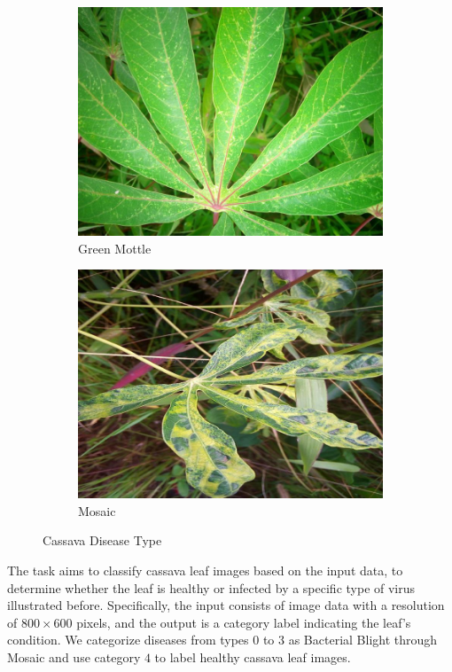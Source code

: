 \begin{figure}[htbp]
\begin{subfigure}{0.24\textwidth}
        \centering
        \includegraphics[width=\linewidth]{graphs/DiseaseImage/GreenMottle.jpg}
        \caption{Green Mottle}
        \label{CassavaFigGreen}
    \end{subfigure}
        \begin{subfigure}{0.24\textwidth}
        \centering
        \includegraphics[width=\linewidth]{graphs/DiseaseImage/Mosaic.jpg}
        \caption{Mosaic}
        \label{CassavaFigMos}
    \end{subfigure}
    \caption{Cassava Disease Type}
    \label{CassavaDisease}
\end{figure}

The task aims to classify cassava leaf images based on the input data, to determine whether the leaf is healthy or infected by a specific type of virus illustrated before. Specifically, the input consists of image data with a resolution of $800 \times 600$ pixels, and the output is a category label indicating the leaf's condition. We categorize diseases from types $0$ to $3$ as Bacterial Blight through Mosaic and use category $4$ to label healthy cassava leaf images.


